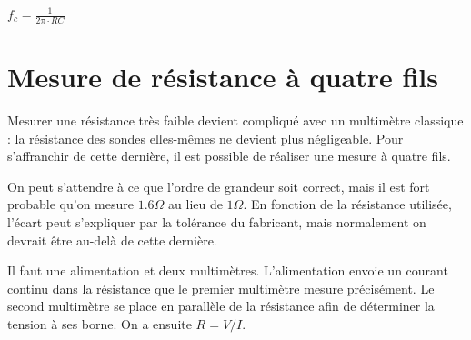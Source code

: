 \documentclass{../template/labo}
\begin{document}
{
	$f_c = \frac{1}{2\pi\cdot RC}$
}

{}

{}







\section{Mesure de résistance à quatre fils}
Mesurer une résistance très faible devient compliqué avec un multimètre classique : la résistance des sondes elles-mêmes ne devient plus négligeable.
Pour s'affranchir de cette dernière, il est possible de réaliser une mesure à quatre fils.


{
	On peut s'attendre à ce que l'ordre de grandeur soit correct, mais il est fort probable qu'on mesure $1.6\Omega$ au lieu de $1\Omega$.
	En fonction de la résistance utilisée, l'écart peut s'expliquer par la tolérance du fabricant, mais normalement on devrait être au-delà de cette dernière.
}

{
	Il faut une alimentation et deux multimètres.
	L'alimentation envoie un courant continu dans la résistance que le premier multimètre mesure précisément.
	Le second multimètre se place en parallèle de la résistance afin de déterminer la tension à ses borne.
	On a ensuite $R = V/I$.
}
\end{document}
